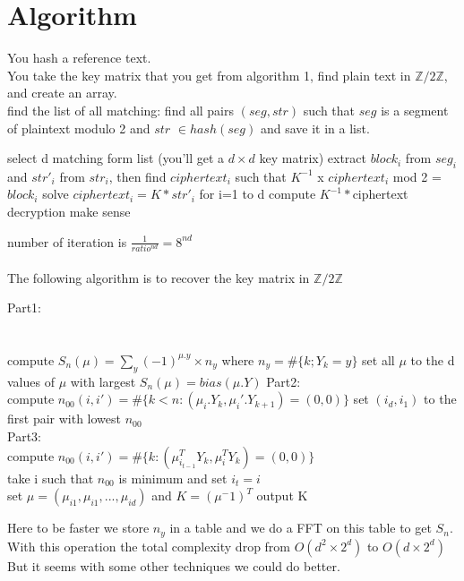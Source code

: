 \documentclass{article}
\begin{document}
\section{Algorithm}
You hash a reference text.\\
You take the key matrix that you get from algorithm 1, find plain text in $\mathbb{Z}/2\mathbb{Z}$, and create an array.\\
find the list of all matching: find all pairs $(seg,str)$ such that $seg$ is a segment of plaintext modulo 2 and $str$ $\in hash(seg)$ and save it in a list.\\
\begin{algorithmic}[1]
	\REPEAT
\STATE select d matching form list (you'll get a $d\times d$ key matrix)
	\STATE extract $block_{i}$ from $seg_{i}$ and $str'_{i}$ from $str_{i}$,
	\STATE then find $ciphertext_{i}$ such that $K^{-1}$ x $ciphertext_{i}$ mod 2 = $block_{i}$
\ENDFOR
\STATE solve $ciphertext_{i} = K * str'_{i}$ for i=1 to d
\STATE compute $K^{-1} * $ciphertext
\UNTIL decryption make sense
\end{algorithmic}
number of iteration is $ \frac{1}{ratio^{nd}} = 8^{nd}$
\\
\\
The following algorithm is to recover the key matrix in $\mathbb{Z}/2\mathbb{Z}$\\
\begin{algorithmic}[1]
\STATE Part1:\\
\\
\\
\FORALL{$\mu$}
	\STATE compute $S_n(\mu) = \sum_{y}{(-1)^{\mu.y} \times n_y}$ where $n_y=\#\{k;Y_k=y\}$
\ENDFOR
\STATE set all $\mu$ to the d values of $\mu$ with largest $S_n(\mu)=bias(\mu.Y)$
\STATE Part2:\\
	\STATE compute $n_{00}(i,i')=\#\{k<n:(\mu_i .Y_k,\mu_i'.Y_{k+1})=(0,0)\}$
\ENDFOR
\STATE set $(i_d,i_1)$ to the first pair with lowest $n_{00}$
\\
\STATE Part3:\\
		\STATE compute $n_{00}(i,i{'})=\#\{k:(\mu^{T}_{i_{t-1}}Y_{k},\mu^{T}_{i}Y_{k})=(0,0)\}$\\
	\ENDFOR
	\STATE take i such that $n_{00}$ is minimum and set $i_t=i$\\
\ENDFOR
\STATE set $\mu = (\mu_{i1},\mu_{i1},...,\mu_{id})$ and $K=(\mu^-1)^T$
\STATE output K
\end{algorithmic}
Here to be faster we store $n_y$ in a table and we do a FFT on this table to get $S_n$. With this operation the total complexity drop from $O(d^2 \times 2^d)$ to $O(d \times 2^d)$
But it seems with some other techniques we could do better.
\end{document}

